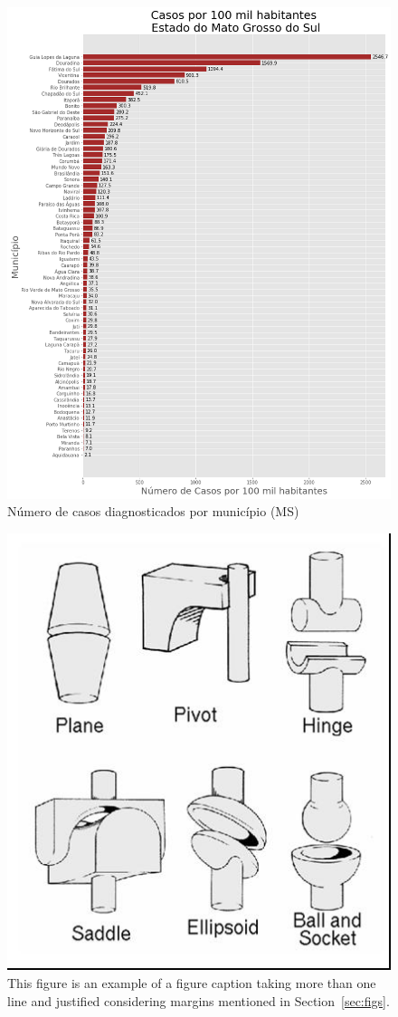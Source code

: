\documentclass[12pt]{article}
\begin{document}
\begin{figure}[!htb]
\centering
\includegraphics[width=1\textwidth]{figs/casos_100_mil_por_municipio.png}
\caption{Número de casos diagnosticados por município (MS)}
\label{fig:casosMuni100k}
\end{figure}

\begin{figure}[ht]
\centering
\includegraphics[width=.3\textwidth]{fig2.jpg}
\caption{This figure is an example of a figure caption taking more than one
  line and justified considering margins mentioned in Section~\ref{sec:figs}.}
\label{fig:exampleFig2}
\end{figure}
\end{document}
